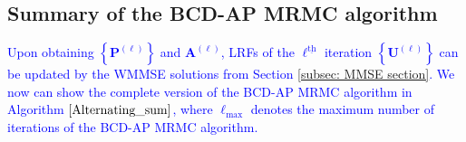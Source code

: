 \documentclass[9pt,journal]{IEEEtran}
\newcommand{\paren}[1]{\left({#1}\right)}
\newcommand{\braces}[1]{{\left\{ {#1}\right\}}}
\newcommand{\ith}[1]    {{#1}^{\underline{\text{th}}}}
\newcommand{\rr}{_\mathrm{r}}
\theoremstyle{definition}
\begin{document}
\subsection{Summary of the BCD-AP MRMC algorithm}
\textcolor{blue}{Upon obtaining $\braces{\mathbf{P}^{\paren{\ell}}}$ and $\mathbf{A}^{\paren{\ell}}$, LRFs of the $\ith{\ell}$ iteration $\braces{\mathbf{U}^{\paren{\ell}}}$ can be updated by the WMMSE solutions from Section \ref{subsec: MMSE section}. We now can show the complete version of the BCD-AP MRMC algorithm in Algorithm $\ref{Alternating_sum}$, where $\mathrm{\ell}_{\textrm{max}}$ denotes the maximum number of iterations of the BCD-AP MRMC algorithm.} %
\par\noindent\small
\end{document}

